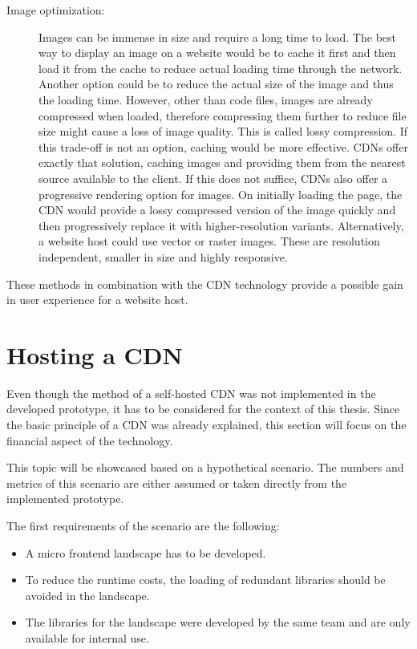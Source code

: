 \begin{description}
	\item[Image optimization:] Images can be immense in size and require a long time to load. The best way to display an image on a website would be to cache it first and then load it from the cache to reduce actual loading time through the network. Another option could be to reduce the actual size of the image and thus the loading time.
	However, other than code files, images are already compressed when loaded, therefore compressing them further to reduce file size might cause a loss of image quality. This is called lossy compression. If this trade-off is not an option, caching would be more effective.
	CDNs offer exactly that solution, caching images and providing them from the nearest source available to the client. If this does not suffice, CDNs also offer a progressive rendering option for images. On initially loading the page, the CDN would provide a lossy compressed version of the image quickly and then progressively replace it with higher-resolution variants.
	Alternatively, a website host could use vector or raster images. These are resolution independent, smaller in size and highly responsive.\cite{cdn_fe_opt_img_opt}
\end{description}

These methods in combination with the CDN technology provide a possible gain in user experience for a website host. \cite{cdn_fe_opt}

\section{Hosting a CDN}

Even though the method of a self-hosted CDN was not implemented in the developed prototype, it has to be considered for the context of this thesis. Since the basic principle of a CDN was already explained, this section will focus on the financial aspect of the technology.

This topic will be showcased based on a hypothetical scenario. The numbers and metrics of this scenario are either assumed or taken directly from the implemented prototype.

The first requirements of the scenario are the following:

\begin{itemize}[noitemsep]
	\item A micro frontend landscape has to be developed. 
	\item To reduce the runtime costs, the loading of redundant libraries should be avoided in the landscape.
	\item The libraries for the landscape were developed by the same team and are only available for internal use.
\end{itemize} 


